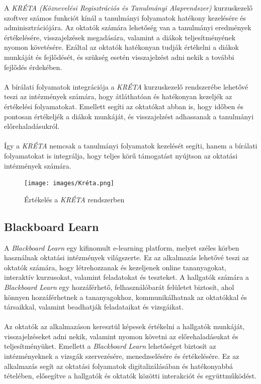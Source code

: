 A \textit{KRÉTA (Köznevelési Regisztrációs és Tanulmányi Alaprendszer)} \cite{kreta} kurzuskezelő szoftver számos funkciót kínál a tanulmányi folyamatok hatékony kezelésére és adminisztrációjára. Az oktatók számára lehetőség van a tanulmányi eredmények értékelésére, visszajelzések megadására, valamint a diákok teljesítményének nyomon követésére. Ezáltal az oktatók hatékonyan tudják értékelni a diákok munkáját és fejlődését, és szükség esetén visszajelzést adni nekik a további fejlődés érdekében.\\
\\
A bírálati folyamatok integrációja a \textit{KRÉTA} kurzuskezelő rendszerébe lehetővé teszi az intézmények számára, hogy átláthatóan és hatékonyan kezeljék az értékelési folyamatokat. Emellett segíti az oktatókat abban is, hogy időben és pontosan értékeljék a diákok munkáját, és visszajelzést adhassanak a tanulmányi előrehaladásukról.\\
\\
Így a \textit{KRÉTA} nemcsak a tanulmányi folyamatok kezelését segíti, hanem a bírálati folyamatokat is integrálja, hogy teljes körű támogatást nyújtson az oktatási intézmények számára.
\begin{figure}[h]
\centering
\texttt{[image: images/Kréta.png]}
\caption{Értékelés a \textit{KRÉTA} rendszerben\cite{kreta_jegy}}
\label{fig:kreta}
\end{figure}
\newpage
\subsection{\textbf{Blackboard Learn}}

A \textit{Blackboard Learn} \cite{blackboard_learn} egy kifinomult e-learning platform, melyet széles körben használnak oktatási intézmények világszerte. Ez az alkalmazás lehetővé teszi az oktatók számára, hogy létrehozzanak és kezeljenek online tananyagokat, interaktív kurzusokat, valamint feladatokat és teszteket. A hallgatók számára a \textit{Blackboard Learn} egy hozzáférhető, felhasználóbarát felületet biztosít, ahol könnyen hozzáférhetnek a tananyagokhoz, kommunikálhatnak az oktatókkal és társaikkal, valamint beadhatják feladataikat és vizsgáikat.\\
\\ Az oktatók az alkalmazáson keresztül képesek értékelni a hallgatók munkáját, visszajelzéseket adni nekik, valamint nyomon követni az előrehaladásukat és teljesítményüket. Emellett a \textit{Blackboard Learn} lehetőséget biztosít az intézményeknek a vizsgák szervezésére, menedzselésére és értékelésére. Ez az alkalmazás segít az oktatási folyamatok digitalizálásában és hatékonyabbá tételében, elősegítve a hallgatók és oktatók közötti interakciót és együttműködést.

